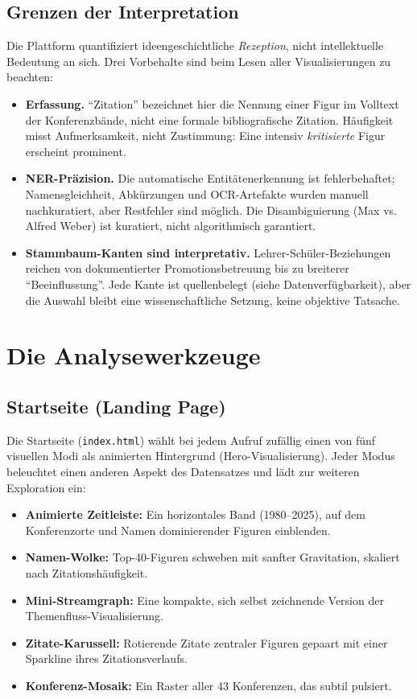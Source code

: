 \documentclass[11pt,a4paper,twoside]{article}
\begin{document}
\subsection{Grenzen der Interpretation}
Die Plattform quantifiziert ideengeschichtliche \emph{Rezeption}, nicht intellektuelle Bedeutung an sich. Drei Vorbehalte sind beim Lesen aller Visualisierungen zu beachten:
\begin{itemize}[leftmargin=*,itemsep=2pt,topsep=2pt]
    \item \textbf{Erfassung.} ``Zitation'' bezeichnet hier die Nennung einer Figur im Volltext der Konferenzbände, nicht eine formale bibliografische Zitation. Häufigkeit misst Aufmerksamkeit, nicht Zustimmung: Eine intensiv \emph{kritisierte} Figur erscheint prominent.
    \item \textbf{NER-Präzision.} Die automatische Entitätenerkennung ist fehlerbehaftet; Namensgleichheit, Abkürzungen und OCR-Artefakte wurden manuell nachkuratiert, aber Restfehler sind möglich. Die Disambiguierung (Max vs. Alfred Weber) ist kuratiert, nicht algorithmisch garantiert.
    \item \textbf{Stammbaum-Kanten sind interpretativ.} Lehrer-Schüler-Beziehungen reichen von dokumentierter Promotionsbetreuung bis zu breiterer ``Beeinflussung''. Jede Kante ist quellenbelegt (siehe Datenverfügbarkeit), aber die Auswahl bleibt eine wissenschaftliche Setzung, keine objektive Tatsache.
\end{itemize}

\section{Die Analysewerkzeuge}

\subsection{Startseite (Landing Page)}
Die Startseite (\texttt{index.html}) wählt bei jedem Aufruf zufällig einen von fünf visuellen Modi als animierten Hintergrund (Hero-Visualisierung). Jeder Modus beleuchtet einen anderen Aspekt des Datensatzes und lädt zur weiteren Exploration ein:
\begin{itemize}[leftmargin=*,itemsep=2pt,topsep=2pt]
    \item \textbf{Animierte Zeitleiste:} Ein horizontales Band (1980--2025), auf dem Konferenzorte und Namen dominierender Figuren einblenden.
    \item \textbf{Namen-Wolke:} Top-40-Figuren schweben mit sanfter Gravitation, skaliert nach Zitationshäufigkeit.
    \item \textbf{Mini-Streamgraph:} Eine kompakte, sich selbst zeichnende Version der Themenfluss-Visualisierung.
    \item \textbf{Zitate-Karussell:} Rotierende Zitate zentraler Figuren gepaart mit einer Sparkline ihres Zitationsverlaufs.
    \item \textbf{Konferenz-Mosaik:} Ein Raster aller 43 Konferenzen, das subtil pulsiert.
\end{itemize}
\end{document}
